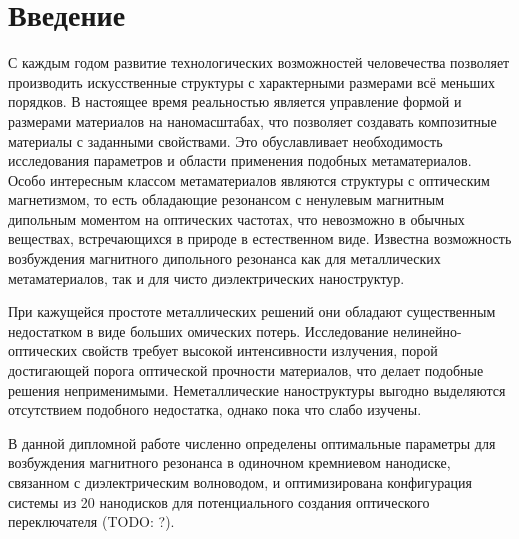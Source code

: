 \chapter{Введение}

С каждым годом развитие технологических возможностей человечества позволяет производить искусственные структуры с характерными размерами всё меньших порядков. В настоящее время реальностью является управление формой и размерами материалов на наномасштабах, что позволяет создавать композитные материалы с заданными свойствами. Это обуславливает необходимость исследования параметров и области применения подобных метаматериалов. Особо интересным классом метаматериалов являются структуры с оптическим магнетизмом, то есть обладающие резонансом с ненулевым магнитным дипольным моментом на оптических частотах, что невозможно в обычных веществах, встречающихся в природе в естественном виде. Известна возможность возбуждения магнитного дипольного резонанса как для металлических метаматериалов, так и для чисто диэлектрических наноструктур.

При кажущейся простоте металлических решений они обладают существенным недостатком в виде больших омических потерь. Исследование нелинейно-оптических свойств требует высокой интенсивности излучения, порой достигающей порога оптической прочности материалов, что делает подобные решения неприменимыми. Неметаллические наноструктуры выгодно выделяются отсутствием подобного недостатка, однако пока что слабо изучены.

В данной дипломной работе численно определены оптимальные параметры для возбуждения магнитного резонанса в одиночном кремниевом нанодиске, связанном с диэлектрическим волноводом, и оптимизирована конфигурация системы из 20 нанодисков для потенциального создания оптического переключателя (TODO: ?).